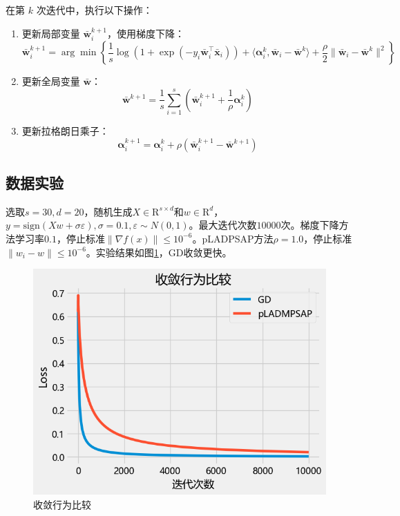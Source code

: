 \documentclass{homework}
\begin{document}
\begin{sol}
在第 $k$ 次迭代中，执行以下操作：

\begin{enumerate}
    \item 更新局部变量 $\bar{\mathbf{w}}_i^{k+1}$，使用梯度下降：
    \[
    \bar{\mathbf{w}}_i^{k+1} = \arg\min \left\{ \frac{1}{s} \log\left(1 + \exp(-y_i \bar{\mathbf{w}}_i^\top \bar{\mathbf{x}}_i)\right) + \langle \bm{\alpha}_i^k, \bar{\mathbf{w}}_i - \bar{\mathbf{w}}^k \rangle + \frac{\rho}{2} \|\bar{\mathbf{w}}_i - \bar{\mathbf{w}}^k\|^2 \right\}
    \]
    
    \item 更新全局变量 $\bar{\mathbf{w}}$：
    \[
    \bar{\mathbf{w}}^{k+1} = \frac{1}{s} \sum_{i=1}^s \left( \bar{\mathbf{w}}_i^{k+1} + \frac{1}{\rho} \bm{\alpha}_i^k \right)
    \]
    
    \item 更新拉格朗日乘子：
    \[
    \bm{\alpha}_i^{k+1} = \bm{\alpha}_i^k + \rho (\bar{\mathbf{w}}_i^{k+1} - \bar{\mathbf{w}}^{k+1})
    \]
\end{enumerate}

\subsection*{数据实验}

选取$s=30,d=20$，随机生成$X\in\mathrm{R}^{s\times d}$和$w\in\mathrm{R}^d$，$y = \text{sign}(Xw+\sigma \varepsilon), \sigma = 0.1,\varepsilon\sim N(0,1)$。最大迭代次数$10000$次。梯度下降方法学习率$0.1$，停止标准$\|\nabla f(x)\|\le10^{-6}$。pLADPSAP方法$\rho = 1.0$，停止标准$\|w_i-w\|\le 10^{-6}$。实验结果如图\ref{fig:2}，GD收敛更快。

\begin{figure}[h]
    \centering
    \includegraphics[width=0.5\linewidth]{2.png}
    \caption{收敛行为比较}
    \label{fig:2}
\end{figure}

\end{sol}
\end{document}
